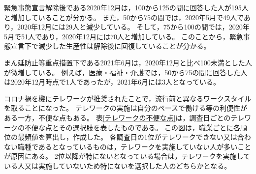 \documentclass[paper={210mm,297mm},fontsize=15Q,line_length=35zw,number_of_lines=31,head_space=30mm,gutter=40mm,baselineskip=2.0zw,headfoot_verticalposition=1.5zw]{jlreq}
\begin{document}
緊急事態宣言解除後である2020年12月は，100から125の間に回答した人が195人と増加していることが分かる。
また，50から75の間では，2020年5月で49人であり，2020年12月には29人と減少している。
そして，75から100の間では，2020年5月で51人であり，2020年12月には70人と増加している。
このことから，緊急事態宣言下で減少した生産性は解除後に回復していることが分かる。

まん延防止等重点措置下である2021年6月は，2020年12月と比べ100未満とした人が微増している。
例えば，医療・福祉・介護では，50から75の間に回答した人は2020年12月時点で1人であったが，2021年6月には3人となっている。

コロナ禍を機にテレワークが推奨されたことで，流行前と異なるワークスタイルを取ることになった。
テレワークの実施は自分のペースで働ける等の利便性がある一方，不便な点もある。
表\ref{テレワークの不便な点}は，調査日ごとのテレワークの不便な点とその選択肢を表したものである。
この図は，職業ごとに各順位の最頻値を算出し，作成した。
各調査日の1位がテレワークできない又は合わない職種であるとなっているものは，テレワークを実施していない人が多いことが原因にある。
2位以降が特にないとなっている場合は，テレワークを実施している人又は実施していないため特にないを選択した人のどちらかとなる。
\end{document}
